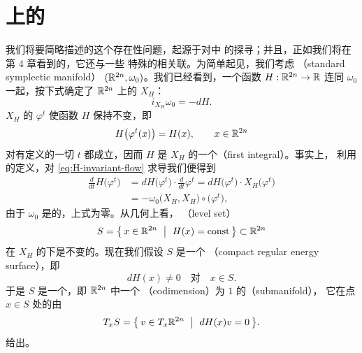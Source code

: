

\section{\trEnergySurface{}上的\trPeriodicOrbit}
\label{sec:periodic-orbits-energy-surfaces}

我们将要简略描述的这个存在性问题，起源于对\trCelestialMechanics{}中%
\trPeriodicSolution{}的探寻；并且，正如我们将在第 4 章看到的，它还与一些%
特殊的\trSymplecticInvariant{}相关联。为简单起见，我们考虑%
\textbf{\trStandard\trSymplecticManifold}（standard symplectic manifold）%
$(\mathbb{R}^{2n},\omega_{0})$。我们已经看到，一个函数 $H:\mathbb{R}^{2n}\to\mathbb{R}$ 连同%
$\omega_{0}$ 一起，按下式确定了 $\mathbb{R}^{2n}$ 上的\trHamiltonianVectorField{} $X_{H}$：
\begin{equation}\label{eq:ixh-omega0}
i_{X_{H}}\omega_{0}=-dH.
\end{equation}
\trVectorField{} $X_{H}$ 的\trFlow{} $\varphi^{t}$ 使函数 $H$ 保持不变，即
\begin{equation}\label{eq:H-invariant-flow}
H\bigl(\varphi^{t}(x)\bigr)=H(x),\qquad x\in\mathbb{R}^{2n}
\end{equation}
对\trFlow{}有定义的一切 $t$ 都成立，因而 $H$ 是 $X_{H}$ 的一个\textbf{\trFirstIntegral}（first integral）。事实上，%
利用\trFlow{}的定义，对 \eqref{eq:H-invariant-flow} 求导我们便得到
\begin{align*}
\frac{d}{dt}H\bigl(\varphi^{t}\bigr) &= dH\bigl(\varphi^{t}\bigr)\cdot\frac{d}{dt}\varphi^{t}
= dH\bigl(\varphi^{t}\bigr)\cdot X_{H}\bigl(\varphi^{t}\bigr)\\
&= -\omega_{0}\bigl(X_{H},X_{H}\bigr)\circ\bigl(\varphi^{t}\bigr),
\end{align*}
由于 $\omega_{0}$ 是\trAntisymmetric{}的，上式为零。从几何上看，%
\textbf{\trLevelSet}（level set）
\[
S=\bigl\{\,x\in\R^{2n}\ \bigm|\ H(x)=\mathrm{const}\,\bigr\}\subset\R^{2n}
\]
在 $X_{H}$ 的\trFlow{}下是不变的。现在我们假设 $S$ 是一个%
\textbf{\trCompact\trRegular\trEnergySurface}（compact regular energy surface），即
\begin{equation}\label{eq:regular-energy-surface}
dH(x)\neq0\quad\text{对}\quad x\in S.
\end{equation}
于是 $S$ 是一个\trSmooth\trHypersurface，即 $\mathbb{R}^{2n}$ 中一个%
\textbf{\trCodimension}（codimension）为 $1$ 的\textbf{\trSubmanifold}（submanifold），%
它在点 $x\in S$ 处的\trTangentSpace{}由
\[
T_{x}S=\bigl\{\,v\in T_{x}\R^{2n}\ \bigm|\ dH(x)v=0\,\bigr\}.
\]
给出。


